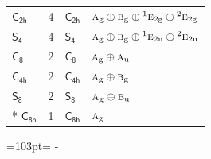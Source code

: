 \documentclass[10pt,a4paper]{article}
\newcommand{\needspace}[1]{\par\penalty-100\begingroup\dimen0=#1\relax\dimen2=\pagegoal
  \advance\dimen2-\pagetotal\ifdim\dimen0>\dimen2\relax\ifdim\dimen2>0pt\vfil\break\fi\fi
  \endgroup}
\numberwithin{equation}{section}
\newcommand{\grp}[1]{\mathsf{#1}}
\newcommand{\irr}[1]{\text{\normalfont\scshape #1}}
\newcommand{\conjpair}[1]{{}^{#1}}
\newcommand{\ptag}[1]{\mathrm{#1}}
\newlength{\fillwidth}\newlength{\cellwidth}\newlength{\colwidth}
\begin{document}
{\begin{longtable}{@{}lrl>{\RaggedRight\arraybackslash}p{\fillwidth}@{}}
\href{C2h.pdf}{$\grp{C_{2h}}$} & 4 & \href{C2h.pdf}{$\grp{C_{2h}}$} & $\irr{a}_{\ptag{g}}\oplus \irr{b}_{\ptag{g}}\oplus \conjpair{1}\irr{e}_{2\ptag{g}}\oplus \conjpair{2}\irr{e}_{2\ptag{g}}$\\
\href{S4.pdf}{$\grp{S_{4}}$} & 4 & \href{S4.pdf}{$\grp{S_{4}}$} & $\irr{a}_{\ptag{g}}\oplus \irr{b}_{\ptag{g}}\oplus \conjpair{1}\irr{e}_{2\ptag{u}}\oplus \conjpair{2}\irr{e}_{2\ptag{u}}$\\
\href{C8.pdf}{$\grp{C_{8}}$} & 2 & \href{C8.pdf}{$\grp{C_{8}}$} & $\irr{a}_{\ptag{g}}\oplus \irr{a}_{\ptag{u}}$\\
\href{C4h.pdf}{$\grp{C_{4h}}$} & 2 & \href{C4h.pdf}{$\grp{C_{4h}}$} & $\irr{a}_{\ptag{g}}\oplus \irr{b}_{\ptag{g}}$\\
\href{S8.pdf}{$\grp{S_{8}}$} & 2 & \href{S8.pdf}{$\grp{S_{8}}$} & $\irr{a}_{\ptag{g}}\oplus \irr{b}_{\ptag{u}}$\\*
\href{C8h.pdf}{$\grp{C_{8h}}$} & 1 & \href{C8h.pdf}{$\grp{C_{8h}}$} & $\irr{a}_{\ptag{g}}$\\
\bottomrule\end{longtable}}
\needspace{103pt}
\end{document}
